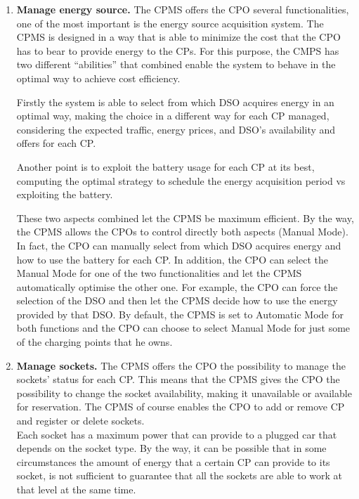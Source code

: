 \documentclass{Configuration_Files/PoliMi3i_thesis}
\begin{document}
\begin{enumerate}
    \item \textbf{Manage energy source.} \newline
    The CPMS offers the CPO several functionalities, one of the most important is the energy source acquisition system. 
    The CPMS is designed in a way that is able to minimize the cost that the CPO has to bear to provide energy to the CPs. 
    For this purpose, the CMPS has two different “abilities” that combined enable the system to behave in the optimal way to achieve cost efficiency. 

    Firstly the system is able to select from which DSO acquires energy in an optimal way, making the choice in a different way for each CP managed, considering the expected traffic, energy prices, and DSO’s availability and offers for each CP. 

    Another point is to exploit the battery usage for each CP at its best, computing the optimal strategy to schedule the energy acquisition period vs exploiting the battery.

    These two aspects combined let the CPMS be maximum efficient. By the way, the CPMS allows the CPOs to control directly both aspects (Manual Mode). In fact, the CPO can manually select from which DSO acquires energy and how to use the battery for each CP. In addition, the CPO can select the Manual Mode for one of the two functionalities and let the CPMS automatically optimise the other one. For example, the CPO can force the selection of the DSO and then let the CPMS decide how to use the energy provided by that DSO. By default, the CPMS is set to Automatic Mode for both functions and the CPO can choose to select Manual Mode for just some of the charging points that he owns.
    \newline
    
    \item \textbf{Manage sockets.} \newline
    The CPMS offers the CPO the possibility to manage the sockets’ status for each CP. This means that the CPMS gives the CPO the possibility to change the socket availability, making it unavailable or available for reservation.
    The CPMS of course enables the CPO to add or remove CP and register or delete sockets.\\

    Each socket has a maximum power that can provide to a plugged car that depends on the socket type. By the way, it can be possible that in some circumstances the amount of energy that a certain CP can provide to its socket, is not sufficient to guarantee that all the sockets are able to work at that level at the same time. 


\end{enumerate}
\end{document}
